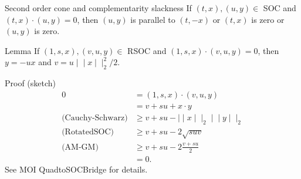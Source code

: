 \documentclass{beamer}
\def\lVert{\mid\!\mid}
\def\rVert{\mid\!\mid}
\begin{document}
\begin{frame}{Second order cone and complementarity slackness}
  If $(t, x), (u, y) \in {}$ SOC and $(t, x) \cdot (u, y) = 0$,
  then $(u, y)$ is parallel to $(t, -x)$ or $(t, x)$ is zero or $(u, y)$ is zero.
  \begin{center}
  \end{center}
\end{frame}

\begin{frame}{Lemma}
  If $(1, s, x), (v, u, y) \in {}$ RSOC and
  $(1, s, x) \cdot (v, u, y) = 0$, then
  $y = -ux$ and $v = u \lVert x \rVert_2^2/2$.

  \begin{block}{Proof (sketch)}
    \begin{align*}
      0 & = (1, s, x) \cdot (v, u, y)\\
      & = v + s u + x \cdot y\\
      \text{(Cauchy-Schwarz)} & \ge
      v + s u - \lVert x\lVert_2 \lVert y\lVert_2\\
      \text{(RotatedSOC)} & \ge
      v + s u - 2 \sqrt{s u  v}\\
      \text{(AM-GM)} & \ge
      v + s  u - 2  \frac{v + s u}{2}\\
      & = 0.
    \end{align*}
    See MOI QuadtoSOCBridge for details.
  \end{block}
\end{frame}
\end{document}
